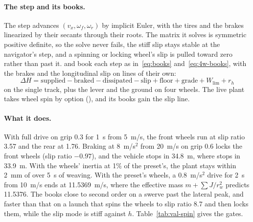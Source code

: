 \documentclass[11pt]{article}
\theoremstyle{remark}
\begin{document}
\paragraph{The step and its books.} The step advances $(v_x,\omega_f,\omega_r)$ by implicit Euler,
with the tires and the brakes linearized by their secants through their roots. The matrix it solves
is symmetric positive definite, so the solve never fails, the stiff slip stays stable at the
navigator's step, and a spinning or locking wheel's slip is pulled toward zero rather than past it.
 and  book each step as
in~\eqref{eq:books} and~\eqref{eq:4w-books}, with the brakes and the longitudinal slip on lines of
their own:
\begin{equation*}
  \Delta H=\text{supplied}-\text{braked}-\text{dissipated}-\text{slip}+\text{floor}+\text{grade}
  +W_{\mathrm{lim}}+r_h
\end{equation*}
on the single track, plus the lever and the ground on four wheels. The live plant takes wheel spin
by option (), and its books gain the slip line.

\paragraph{What it does.} With full drive on grip 0.3 for 1~s from 5~m/s, the front wheels run at
slip ratio 3.57 and the rear at 1.76. Braking at 8~m/s$^2$ from 20~m/s on grip 0.6 locks the front
wheels (slip ratio $-0.97$), and the vehicle stops in 34.8~m, where  stops in
33.9~m. With the wheels' inertia at 1\% of the preset's, the plant stays within 2~mm of
 over 5~s of weaving. With the preset's wheels, a 0.8~m/s$^2$ drive for 2~s from
10~m/s ends at 11.5369~m/s, where the effective mass $m+\sum J/r_w^2$ predicts 11.5376. The books
close to second order on a swerve past the lateral peak, and faster than that on a launch that spins
the wheels to slip ratio 8.7 and then locks them, while the slip mode is stiff against $h$.
Table~\ref{tab:val-spin} gives the gates.
\end{document}
